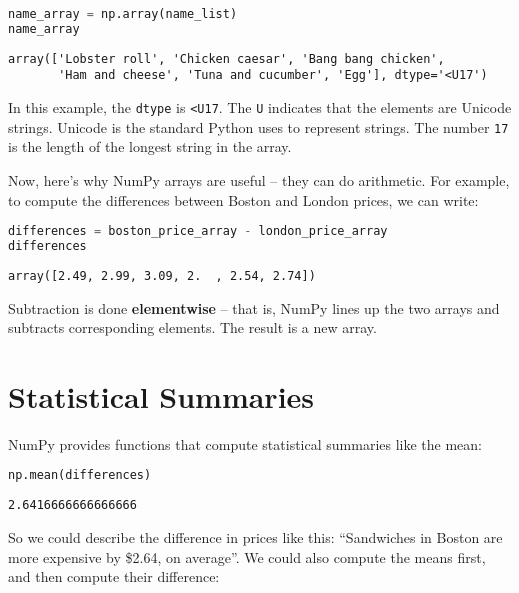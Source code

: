 \begin{lstlisting}[language=Python,style=source]
name_array = np.array(name_list)
name_array
\end{lstlisting}

\begin{lstlisting}[style=output]
array(['Lobster roll', 'Chicken caesar', 'Bang bang chicken',
       'Ham and cheese', 'Tuna and cucumber', 'Egg'], dtype='<U17')
\end{lstlisting}

In this example, the \passthrough{\lstinline!dtype!} is
\passthrough{\lstinline!<U17!}. The \passthrough{\lstinline!U!}
indicates that the elements are Unicode strings. Unicode is the standard
Python uses to represent strings. The number
\passthrough{\lstinline!17!} is the length of the longest string in the
array.

Now, here's why NumPy arrays are useful -- they can do arithmetic. For
example, to compute the differences between Boston and London prices, we
can write:

\begin{lstlisting}[language=Python,style=source]
differences = boston_price_array - london_price_array
differences
\end{lstlisting}

\begin{lstlisting}[style=output]
array([2.49, 2.99, 3.09, 2.  , 2.54, 2.74])
\end{lstlisting}

Subtraction is done \textbf{elementwise} -- that is, NumPy lines up the
two arrays and subtracts corresponding elements. The result is a new
array.

\section{Statistical Summaries}\label{statistical-summaries}

NumPy provides functions that compute statistical summaries like the
mean:

\begin{lstlisting}[language=Python,style=source]
np.mean(differences)
\end{lstlisting}

\begin{lstlisting}[style=output]
2.6416666666666666
\end{lstlisting}

So we could describe the difference in prices like this: ``Sandwiches in
Boston are more expensive by \$2.64, on average''. We could also compute
the means first, and then compute their difference:

